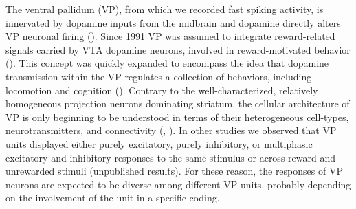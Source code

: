 The ventral pallidum (VP), from which we recorded fast spiking activity, is innervated by dopamine inputs from the midbrain and dopamine directly alters VP neuronal firing (\cite{Napier89}). Since 1991 VP was assumed to integrate reward-related signals carried by VTA dopamine neurons, involved in reward-motivated behavior (\cite{Napier91}). This concept was quickly expanded to encompass the idea that dopamine transmission within the VP regulates a collection of behaviors, including locomotion and cognition (\cite{Napier92}). Contrary to the well-characterized, relatively homogeneous projection neurons dominating striatum, the cellular architecture of VP is only beginning to be understood in terms of their heterogeneous cell-types, neurotransmitters, and connectivity (\cite{Heimer1997}, \cite{Tachibana2012}). In other studies we observed that VP units displayed either purely excitatory, purely inhibitory, or multiphasic excitatory and inhibitory responses to the same stimulus or across reward and unrewarded stimuli (unpublished results). For these reason, the responses of VP neurons are expected to be diverse among different VP units, probably depending on the involvement of the unit in a specific coding.
